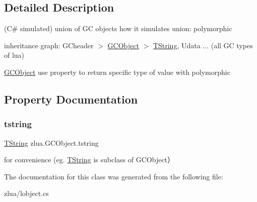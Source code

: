 \subsection{Detailed Description}
(C\# simulated) union of GC objects how it simulates union\+: polymorphic 


\begin{DoxyEnumerate}
\item inheritance graph\+: G\+Cheader $>$ \mbox{\hyperlink{classzlua_1_1_g_c_object}{G\+C\+Object}} $>$ \mbox{\hyperlink{classzlua_1_1_t_string}{T\+String}}, Udata ... (all GC types of lua)
\item \mbox{\hyperlink{classzlua_1_1_g_c_object}{G\+C\+Object}} use property to return specific type of value with polymorphic 
\end{DoxyEnumerate}

\subsection{Property Documentation}
\mbox{\label{classzlua_1_1_g_c_object_adcdbddfaf950e2317f916f184d5b9cfb}} 
\subsubsection{\texorpdfstring{tstring}{tstring}}
{\footnotesize\ttfamily \mbox{\hyperlink{classzlua_1_1_t_string}{T\+String}} zlua.\+G\+C\+Object.\+tstring\hspace{0.3cm}{\ttfamily [get]}}



for convenience (eg. \mbox{\hyperlink{classzlua_1_1_t_string}{T\+String}} is subclass of G\+C\+Object） 



The documentation for this class was generated from the following file\+:\begin{DoxyCompactItemize}
\item 
zlua/lobject.\+cs\end{DoxyCompactItemize}
